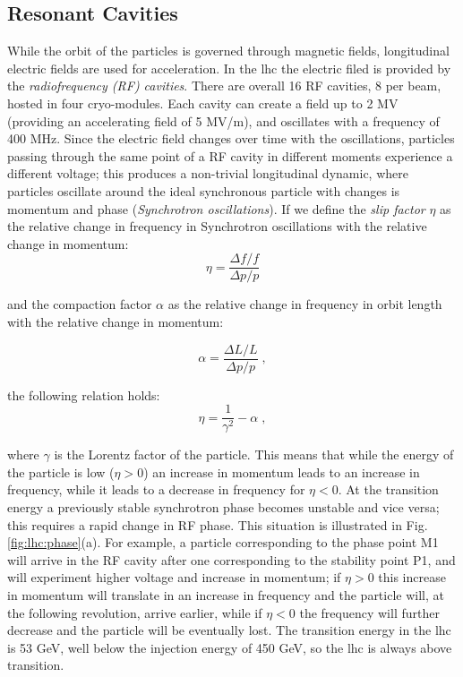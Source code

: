 \subsection{Resonant Cavities}

While the orbit of the particles is governed through magnetic fields, longitudinal electric fields are used for acceleration. In the \gls{lhc} the electric filed is provided by the \textit{radiofrequency (RF) cavities}. There are overall 16 RF cavities, 8 per beam, hosted in four cryo-modules. Each cavity can create a field up to 2 MV (providing an accelerating field of 5 MV/m), and oscillates with a frequency of 400 MHz. Since the electric field changes over time with the oscillations, particles passing through the same point of a RF cavity in different moments experience a different voltage; this produces a non-trivial longitudinal dynamic, where particles oscillate around the ideal synchronous particle with changes is momentum and phase (\textit{Synchrotron oscillations}). If we define the \textit{slip factor} $\eta$ as the relative change in frequency in Synchrotron oscillations with the relative change in momentum:
\begin{equation}
\eta = \frac{\Delta f / f}{\Delta p / p}
\end{equation}

and the compaction factor $\alpha$ as the relative change in frequency in orbit length with the relative change in momentum:

\begin{equation}
\alpha = \frac{\Delta L / L}{\Delta p / p} \; ,
\end{equation}

the following relation holds:
\begin{equation}
\eta = \frac{1}{\gamma^2} - \alpha \; ,
\end{equation}

where $\gamma$ is the Lorentz factor of the particle. This means that while the energy of the particle is low ($\eta>0$) an increase in momentum leads to an increase in frequency, while it leads to a decrease in frequency for $\eta<0$. At the transition energy a previously stable synchrotron phase becomes unstable and vice versa; this requires a rapid change in RF phase. This situation is illustrated in Fig. \ref{fig:lhc:phase}(a). For example, a particle corresponding to the phase point M1 will arrive in the RF cavity after one corresponding to the stability point P1, and will experiment higher voltage and increase in momentum; if $\eta>0$ this increase in momentum will translate in an increase in frequency and the particle will, at the following revolution, arrive earlier, while if $\eta<0$ the frequency will further decrease and the particle will be eventually lost.  The transition energy in the \gls{lhc} is 53 GeV, well below the injection energy of 450 GeV, so the \gls{lhc} is always above transition. 


